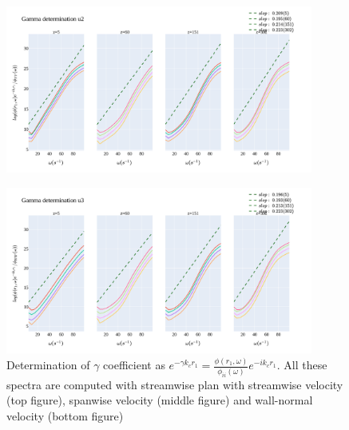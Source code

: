 \documentclass[]{article}
\theoremstyle{plain}
\theoremstyle{remark}
\begin{document}
\begin{figure}[h!]
	\begin{center}
		\includegraphics[width=0.9\textwidth]{../output/split_time/gamma/gamma_u2.png}
	\end{center}
\end{figure}

\begin{figure}[h!]
	\begin{center}
		\includegraphics[width=0.9\textwidth]{../output/split_time/gamma/gamma_u3.png}
		\caption{Determination of $\gamma$ coefficient as $e^{-\gamma k_c r_1} = \frac{\phi(r_1,\omega)}{\phi_{ii}(\omega)}e^{-ik_cr_1}$. All these spectra are computed with streamwise plan with streamwise velocity (top figure), spanwise velocity (middle figure) and wall-normal velocity (bottom figure)}
	\end{center}
\end{figure}
	
	
\end{document}
